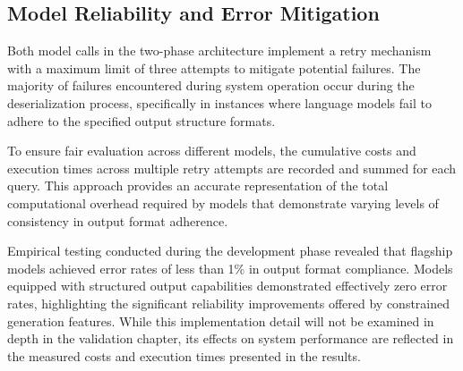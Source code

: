 \subsection{Model Reliability and Error Mitigation}

Both model calls in the two-phase architecture implement a retry mechanism with a maximum limit of three attempts to mitigate potential failures.
The majority of failures encountered during system operation occur during the deserialization process, specifically in instances where language models fail to adhere to the specified output structure formats.

To ensure fair evaluation across different models, the cumulative costs and execution times across multiple retry attempts are recorded and summed for each query.
This approach provides an accurate representation of the total computational overhead required by models that demonstrate varying levels of consistency in output format adherence.

Empirical testing conducted during the development phase revealed that flagship models achieved error rates of less than 1\% in output format compliance.
Models equipped with structured output capabilities demonstrated effectively zero error rates, highlighting the significant reliability improvements offered by constrained generation features.
While this implementation detail will not be examined in depth in the validation chapter, its effects on system performance are reflected in the measured costs and execution times presented in the results.
